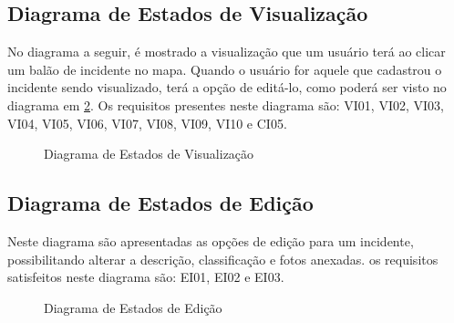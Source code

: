 \documentclass[12pt]{article}
\begin{document}
\vfill%
\pagebreak%

\subsection{Diagrama de Estados de Visualização}

No diagrama a seguir, é mostrado a visualização que um usuário terá ao clicar um balão de incidente no mapa. Quando o usuário for aquele que cadastrou o incidente sendo visualizado, terá a opção de editá-lo, como poderá ser visto no diagrama em \ref{fig:diagEstadoEdicao}. Os requisitos presentes neste diagrama são: VI01, VI02, VI03, VI04, VI05, VI06, VI07, VI08, VI09, VI10 e CI05.

  \begin{figure}[!htb]
    \caption{\label{fig:diagEstadoVisualizacao} Diagrama de Estados de Visualização}
  \end{figure}

\vfill%
\pagebreak%

\subsection{Diagrama de Estados de Edição}
\label{subsec:diagEstadoEdicao}

Neste diagrama são apresentadas as opções de edição para um incidente, possibilitando alterar a descrição, classificação e fotos anexadas. os requisitos satisfeitos neste diagrama são: EI01, EI02 e EI03.

  \begin{figure}[!htb]
    \caption{\label{fig:diagEstadoEdicao} Diagrama de Estados de Edição}
  \end{figure}
\end{document}

